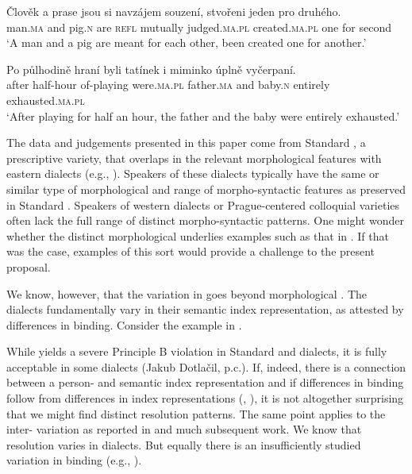 \documentclass[output=paper,modfontsnewtxmath,hidelinks]{langscibook}
\begin{document}
\ea\gll Člověk a prase jsou si navzájem souzení, stvořeni jeden pro druhého.\label{colloq}\\
man.\textsc{ma} and pig.\textsc{n} are \textsc{refl} mutually judged.\textsc{ma.pl} created.\textsc{ma.pl} one for second\\
\glt `A man and a pig are meant for each other, been created one for another.'
\z

\ea\gll Po půlhodině hraní byli tatínek i miminko úplně vyčerpaní.\label{human}\\
after half-hour of-playing were.\textsc{ma.pl} father.\textsc{ma} and baby.\textsc{n} entirely exhausted.\textsc{ma.pl}\\
\glt `After playing for half an hour, the father and the baby were entirely exhausted.'
\z

\noindent The data and judgements presented in this paper come from Standard , a prescriptive variety, that  overlaps in the relevant morphological features with eastern  dialects (e.g., \citealt[401--404]{KarlikEtAl:2002}). Speakers of these dialects typically have the same or similar type of morphological  and range of morpho-syntactic features as preserved in Standard . Speakers of western dialects or Prague-centered colloquial varieties often lack the full range of distinct morpho-syntactic patterns. One might wonder whether the distinct morphological  underlies examples such as that in . If that was the case, examples of this sort would provide a challenge to the present proposal.

We know, however, that the variation in  goes beyond morphological . The dialects fundamentally vary in their semantic index representation, as attested by differences in binding. Consider the example in .

\z

\noindent While  yields a severe Principle B violation in Standard  and  dialects, it is fully acceptable in some  dialects (Jakub Dotlačil, p.c.). If, indeed, there is a connection between a person- and semantic index representation and if differences in binding follow from differences in index representations (\citealt{Heim1998}, \citealt{Roelofsen2008}), it is not altogether surprising that we might find distinct resolution patterns. The same point applies to the inter- variation as reported in \citet{corbett83} and much subsequent work. We know that  resolution varies in  dialects. But equally there is an insufficiently studied variation in binding (e.g., \citealt{Nikolaeva2014}). 
\end{document}
